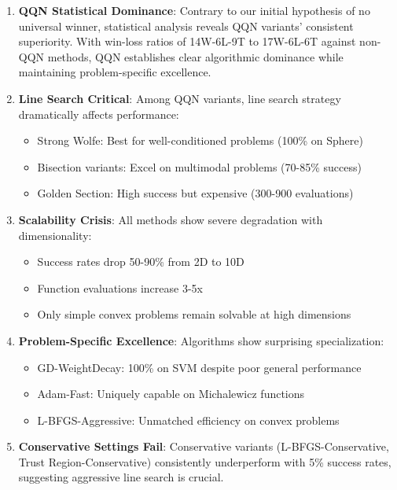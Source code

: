 \begin{enumerate}
\def\labelenumi{\arabic{enumi}.}
\item
  \textbf{QQN Statistical Dominance}: Contrary to our initial hypothesis of no universal winner, statistical analysis reveals QQN variants' consistent superiority. With win-loss ratios of 14W-6L-9T to 17W-6L-6T against non-QQN methods, QQN establishes clear algorithmic dominance while maintaining problem-specific excellence.
\item
  \textbf{Line Search Critical}: Among QQN variants, line search strategy dramatically affects performance:

  \begin{itemize}
  \tightlist
  \item
    Strong Wolfe: Best for well-conditioned problems (100\% on Sphere)
  \item
    Bisection variants: Excel on multimodal problems (70-85\% success)
  \item
    Golden Section: High success but expensive (300-900 evaluations)
  \end{itemize}
\item
  \textbf{Scalability Crisis}: All methods show severe degradation with dimensionality:

  \begin{itemize}
  \tightlist
  \item
    Success rates drop 50-90\% from 2D to 10D
  \item
    Function evaluations increase 3-5x
  \item
    Only simple convex problems remain solvable at high dimensions
  \end{itemize}
\item
  \textbf{Problem-Specific Excellence}: Algorithms show surprising specialization:

  \begin{itemize}
  \tightlist
  \item
    GD-WeightDecay: 100\% on SVM despite poor general performance
  \item
    Adam-Fast: Uniquely capable on Michalewicz functions
  \item
    L-BFGS-Aggressive: Unmatched efficiency on convex problems
  \end{itemize}
\item
  \textbf{Conservative Settings Fail}: Conservative variants (L-BFGS-Conservative, Trust Region-Conservative) consistently underperform with 5\% success rates, suggesting aggressive line search is crucial.
\end{enumerate}

